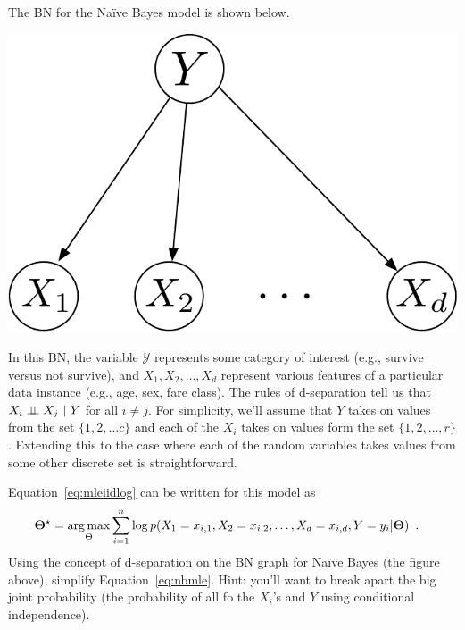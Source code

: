 \documentclass[assignment03_Solutions]{subfiles}
\begin{document}
\vspace{1em}
\begin{exercise}[(60 minutes)]
The BN for the Na\"ive Bayes model is shown below.

\begin{center}
\includegraphics[width=0.3\linewidth]{figures/naivebayesgm}
\end{center}

In this BN, the variable $\mathcal{Y}$ represents some category of interest (e.g., survive versus not survive), and $X_1, X_2, \ldots, X_d$ represent various features of a particular data instance (e.g., age, sex, fare class).  The rules of d-separation tell us that $X_i \perp\!\!\!\perp X_j~|~Y$ for all $i \neq j$.  For simplicity, we'll assume that $Y$ takes on values from the set $\{1, 2, \ldots c \}$ and each of the $X_i$ takes on values form the set $\{1, 2, \ldots, r\}$.  Extending this to the case where each of the random variables takes values from some other discrete set is straightforward.


\bes
\item Equation~\ref{eq:mleiidlog} can be written for this model as
\begin{align}
\mathbf{\Theta^\star} &= \operatorname*{arg\,max}_{\Theta} \sum_{i=1}^n \log p(X_1 = x_{i,1}, X_2 = x_{i,2}, \ldots, X_d = x_{i,d}, Y = y_i | \mathbf{\Theta}) \enspace . \label{eq:nbmle}
\end{align}
Using the concept of d-separation on the BN graph for Na\"ive Bayes (the figure above), simplify Equation~\ref{eq:nbmle}.  Hint: you'll want to break apart the big joint probability (the probability of all fo the $X_i$'s and $Y$ using conditional independence).


\end{exercise}
\end{document}
